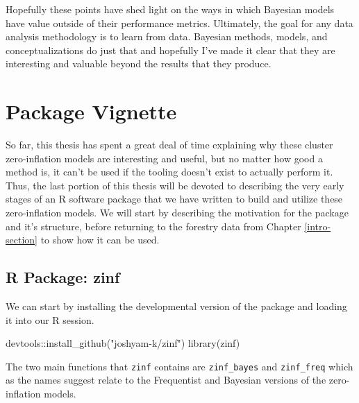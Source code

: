 \documentclass[12pt,twoside]{reedthesis}
\newenvironment{Shaded}{\begin{snugshade}}{\end{snugshade}}
\newcommand{\FunctionTok}[1]{\textcolor[rgb]{0.00,0.00,0.00}{#1}}
\newcommand{\NormalTok}[1]{#1}
\newcommand{\SpecialCharTok}[1]{\textcolor[rgb]{0.00,0.00,0.00}{#1}}
\newcommand{\StringTok}[1]{\textcolor[rgb]{0.31,0.60,0.02}{#1}}
\begin{document}
Hopefully these points have shed light on the ways in which Bayesian models have value outside of their performance metrics. Ultimately, the goal for any data analysis methodology is to learn from data. Bayesian methods, models, and conceptualizations do just that and hopefully I've made it clear that they are interesting and valuable beyond the results that they produce.

\hypertarget{vignette}{%
\chapter{Package Vignette}\label{vignette}}

So far, this thesis has spent a great deal of time explaining why these cluster zero-inflation models are interesting and useful, but no matter how good a method is, it can't be used if the tooling doesn't exist to actually perform it. Thus, the last portion of this thesis will be devoted to describing the very early stages of an R software package that we have written to build and utilize these zero-inflation models. We will start by describing the motivation for the package and it's structure, before returning to the forestry data from Chapter \ref{intro-section} to show how it can be used.

\hypertarget{r-package-zinf}{%
\section{R Package: zinf}\label{r-package-zinf}}

We can start by installing the developmental version of the package and loading it into our R session.
\begin{Shaded}
\begin{Highlighting}[]
\NormalTok{devtools}\SpecialCharTok{::}\FunctionTok{install\_github}\NormalTok{(}\StringTok{"joshyam{-}k/zinf"}\NormalTok{)}
\FunctionTok{library}\NormalTok{(zinf)}
\end{Highlighting}
\end{Shaded}
The two main functions that \texttt{zinf} contains are \texttt{zinf\_bayes} and \texttt{zinf\_freq} which as the names suggest relate to the Frequentist and Bayesian versions of the zero-inflation models.
\end{document}
